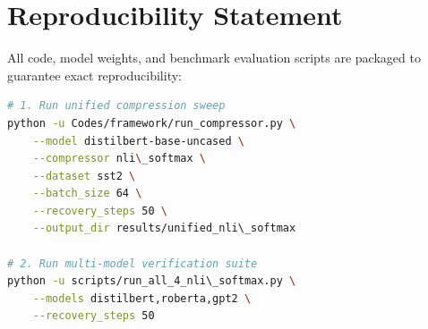 \section{Reproducibility Statement}
All code, model weights, and benchmark evaluation scripts are packaged to guarantee exact reproducibility:
\begin{lstlisting}[language=bash]
# 1. Run unified compression sweep
python -u Codes/framework/run_compressor.py \
    --model distilbert-base-uncased \
    --compressor nli\_softmax \
    --dataset sst2 \
    --batch_size 64 \
    --recovery_steps 50 \
    --output_dir results/unified_nli\_softmax

# 2. Run multi-model verification suite
python -u scripts/run_all_4_nli\_softmax.py \
    --models distilbert,roberta,gpt2 \
    --recovery_steps 50
\end{lstlisting}
